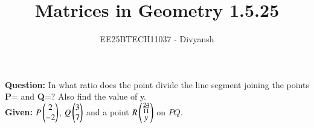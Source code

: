 \documentclass[journal,12pt,onecolumn]{IEEEtran}
\title{Matrices in Geometry 1.5.25}
\author{EE25BTECH11037 - Divyansh}
\theoremstyle{remark}
\begin{document}
\vspace{3cm}
\maketitle
{\let\newpage\relax\maketitle}
\textbf{Question: }
In what ratio does the point  divide the line segment joining the points \textbf{P}= and \textbf{Q}=? Also find the value of y.\\

\textbf{Given: } 
$P\myvec{2\\-2}$, $Q\myvec{3\\7}$ and a point $R  \myvec{\frac{24}{11} \\ y}$ on $PQ$.
\end{document}
